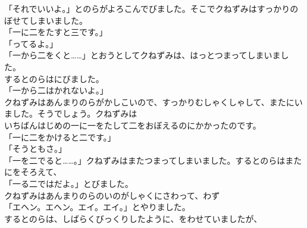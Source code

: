 \documentclass[
    a4paper,
    10pt,
    book]
    {tarticle}
\begin{document}
「それでいいよ。」とのらがよろこんでびました。そこでクねずみはすっかりのぼせてしまいました。\\
「一に二をたすと三です。」\\
「ってるよ。」\\
「一から二をくと……」とおうとしてクねずみは、はっとつまってしまいました。\\
\indent するとのらはにびました。\\
「一から二はかれないよ。」\\
\indent クねずみはあんまりのらがかしこいので、すっかりむしゃくしゃして、またにいました。そうでしょう。クねずみは\\
いちばんはじめの一に一をたして二をおぼえるのにかかったのです。\\
「一に二をかけると二です。」\\
「そうともさ。」\\
「一を二でると……。」クねずみはまたつまってしまいました。するとのらはまたにをそろえて、\\
「一る二ではだよ。」とびました。\\
\indent クねずみはあんまりのらのいのがしゃくにさわって、わず\\
「エヘン。エヘン。エイ。エイ。」とやりました。\\
するとのらは、しばらくびっくりしたように、をわせていましたが、
\newpage
\thispagestyle{fancy}
\end{document}
